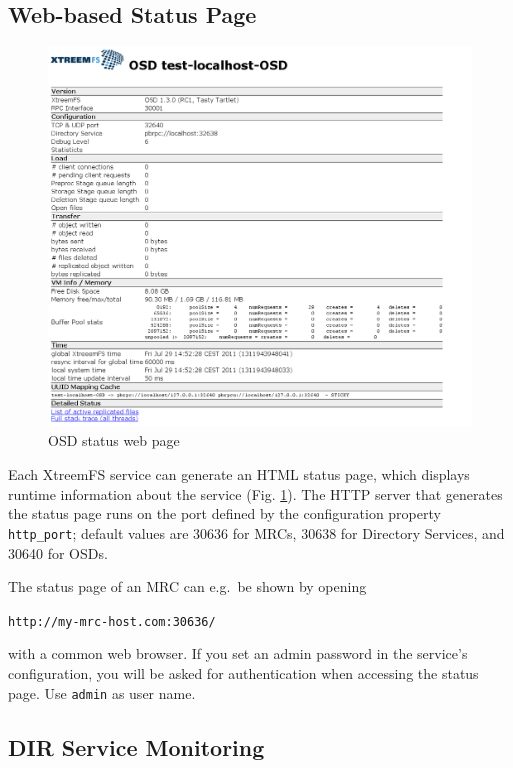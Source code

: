 \documentclass[a4paper,10pt]{book}
\begin{document}
\subsection{Web-based Status Page}

\begin{figure}[h]
 \centering
 \includegraphics[width=\linewidth]{images/screenshot_status.png}
 \caption{OSD status web page}
 \label{fig:screenshot_status}
\end{figure}

Each XtreemFS service can generate an HTML status page, which displays runtime information about the service (Fig. \ref{fig:screenshot_status}). The HTTP server that generates the status page runs on the port defined by the configuration property \texttt{http\_port}; default values are 30636 for MRCs, 30638 for Directory Services, and 30640 for OSDs.

The status page of an MRC can e.g.\ be shown by opening

\texttt{http://my-mrc-host.com:30636/}

with a common web browser. If you set an admin password in the service's configuration, you will be asked for authentication when accessing the status page. Use \texttt{admin} as user name.

\subsection{DIR Service Monitoring}
\end{document}
